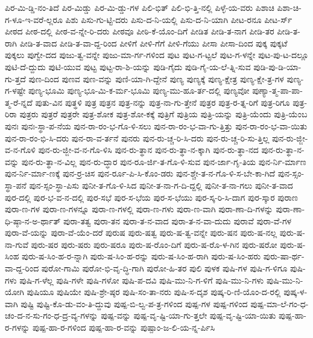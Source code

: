 {ಪಿರ-ಮಿ-ಡ್ಡಿ-ನಂ-ತಿದೆ
ಪಿರ-ಮಿಡ್ಡು
ಪಿರ-ಮಿ-ಡ್ಡು-ಗಳ
ಪಿಲಿ-ಭಿತ್
ಪಿಲಿ-ಭಿ-ತ್ತಿ-ನಲ್ಲಿ
ಪಿಳ್ಳೆ-ಯ-ವರು
ಪಿಶಾಚಿ
ಪಿಶಾ-ಚಿ-ಗ-ಳೂ-ಇ-ವರೆ-ಲ್ಲರೂ
ಪಿಶು
ಪಿಸು-ಗು-ಟ್ಟಿ-ದರು
ಪಿಸು-ದ-ನಿ-ಯಲ್ಲಿ
ಪಿಸು-ದ-ನಿ-ಯಾಗಿ
ಪೀಟ-ರನೂ
ಪೀಟ-ರ್ಸ್
ಪೀಠದ
ಪೀಠ-ದಲ್ಲಿ
ಪೀಠ-ವ-ನ್ನೇ-ರಿ-ದರು
ಪೀಠವೂ
ಪೀಠಿ-ಕೆ-ಯೊಂ-ದಿಗೆ
ಪೀಡಿತ
ಪೀಡಿ-ತ-ನಾಗ
ಪೀಡಿ-ತರ
ಪೀಡಿ-ತ-ರಾಗಿ
ಪೀಡಿ-ತ-ವಾದ
ಪೀಡಿ-ತ-ವಾ-ದ್ದ-ರಿಂದ
ಪೀಳಿಗೆ
ಪೀಳಿ-ಗೆಗೆ
ಪೀಳಿ-ಗೆಯು
ಪೀಸಾ
ಪೀಸಾ-ದಿಂದ
ಪುಕ್ಕ
ಪುಕ್ಕಟೆ
ಪುಕ್ಕಲು
ಪುಗ್ವೇ-ದದ
ಪುಜು-ತ್ವ-ವನ್ನೇ
ಪುಜು-ಮಾ-ರ್ಗ-ಗಳಿಂದ
ಪುಟ
ಪುಟ-ಗ-ಟ್ಟಲೆ
ಪುಟ-ಗ-ಳನ್ನೇ
ಪುಟ-ಪು-ಟ-ದಲ್ಲೂ
ಪುಟಿ-ದೆ-ದ್ದುದು
ಪುಟಿ-ಯುವ
ಪುಟ್ಟ
ಪುಟ್ಟ-ರಾ-ಶಿ-ಯನ್ನು
ಪುಡಿ-ಗೈದು
ಪುಡಿ-ಗೈ-ಯ-ಲೆ-ತ್ನಿ-ಸುವ
ಪುಡಿ-ಪು-ಡಿ-ಯಾ-ಗು-ತ್ತದೆ
ಪುಣ-ದಿಂದ
ಪುಣವ
ಪುಣ-ವನ್ನು
ಪುಣಿ-ಯಾ-ಗಿ-ದ್ದೇನೆ
ಪುಣ್ಯ
ಪುಣ್ಯಕ್ಕೆ
ಪುಣ್ಯ-ಕ್ಷೇತ್ರ
ಪುಣ್ಯ-ಕ್ಷೇ-ತ್ರ-ಗಳ
ಪುಣ್ಯ-ಗ-ಳಷ್ಟೇ
ಪುಣ್ಯ-ಭೂಮಿ
ಪುಣ್ಯ-ಭೂ-ಮಿ-ಕ-ರ್ಮ-ಭೂಮಿ
ಪುಣ್ಯ-ಮು-ಹೂ-ರ್ತ-ದಲ್ಲಿ
ಪುಣ್ಯವೋ
ಪುಣ್ಯಾ-ತ್ಮ-ಪಾ-ಪಾ-ತ್ಮ-ರೆ-ನ್ನದೆ
ಪುತು-ವಿನ
ಪುತ್ಥಳಿ
ಪುತ್ರ
ಪುತ್ರನ
ಪುತ್ರ-ನನ್ನು
ಪುತ್ರ-ನಾ-ಗು-ತ್ತೇನೆ
ಪುತ್ರರ
ಪುತ್ರ-ರ-ತ್ನ-ರಿಗೆ
ಪುತ್ರ-ರಿಗೂ
ಪುತ್ರ-ರಿರಾ
ಪುತ್ರರು
ಪುತ್ರರೆ
ಪುತ್ರರೇ
ಪುತ್ರ-ಶೋಕ
ಪುತ್ರ-ಶೋ-ಕಕ್ಕೆ
ಪುತ್ರಿಗೆ
ಪುತ್ರಿಯ
ಪುತ್ರಿ-ಯನ್ನು
ಪುತ್ರಿ-ಯೆಂದು
ಪುತ್ರಿ-ಯೆಂಬ
ಪುನಃ
ಪುನಃ-ಸ್ಥಾ-ಪ-ನೆಯ
ಪುನ-ರಾ-ರಂ-ಭ-ಗೊ-ಳಿ-ಸಲು
ಪುನ-ರಾ-ರಂ-ಭ-ವಾ-ಗು-ತ್ತಿತ್ತು
ಪುನ-ರಾ-ರಂ-ಭ-ವಾ-ಯಿತು
ಪುನ-ರಾ-ರಂ-ಭಿ-ಸಿ-ದರು
ಪುನ-ರಾ-ವ-ರ್ತನೆ
ಪುನರು
ಪುನ-ರು-ಚ್ಚ-ರಿ-ಸಿ-ದರು
ಪುನ-ರು-ಚ್ಚ-ರಿ-ಸು-ತ್ತಿಲ್ಲ
ಪುನ-ರು-ಜ್ಜೀ-ವ-ನ-ಗೊಳಿ
ಪುನ-ರು-ಜ್ಜೀ-ವ-ನ-ಗೊ-ಳಿಸಿ
ಪುನ-ರು-ತ್ಥಾನ
ಪುನ-ರು-ತ್ಥಾ-ನ-ಕ್ಕಾಗಿ
ಪುನ-ರು-ತ್ಥಾ-ನದ
ಪುನ-ರು-ತ್ಥಾ-ನ-ವನ್ನು
ಪುನ-ರು-ತ್ಥಾ-ನ-ವಿಲ್ಲ
ಪುನ-ರು-ದ್ಧಾರ
ಪುನ-ರೂ-ರ್ಜಿ-ತ-ಗೊ-ಳಿ-ಸುವ
ಪುನ-ರ್ಜಾ-ಗೃ-ತಿಯ
ಪುನ-ರ್ನಿ-ರ್ಮಾಣ
ಪುನ-ರ್ನಿ-ರ್ಮಾ-ಣಕ್ಕೆ
ಪುನ-ರ್ರ-ಚಿಸ
ಪುನ-ರ್ರೂ-ಪಿ-ಸಿ-ಕೊಂ-ಡರು
ಪುನ-ಶ್ಚೇ-ತ-ನ-ಗೊ-ಳಿ-ಸ-ಬೇ-ಕಾ-ಗಿದೆ
ಪುನ-ಸ್ಸಂ-ಸ್ಥಾ-ಪನೆ
ಪುನ-ಸ್ಸಂ-ಸ್ಥಾ-ಪಿಸು
ಪುನೀ-ತ-ಗೊ-ಳಿ-ಸಿದ
ಪುನೀ-ತ-ನಾ-ಗ-ದಿ-ದ್ದಲ್ಲಿ
ಪುನೀ-ತ-ನಾ-ಗಲು
ಪುನೀ-ತ-ವಾದ
ಪುರ-ದಲ್ಲಿ
ಪುರ-ಭ-ವ-ನ-ದಲ್ಲಿ
ಪುರ-ಸಭೆ
ಪುರ-ಸ-ಭೆಯ
ಪುರ-ಸ-ಭೆಯು
ಪುರ-ಸ್ಕ-ರಿ-ಸಿ-ದಾಗ
ಪುರ-ಸ್ಕಾರ
ಪುರಾಣ
ಪುರಾ-ಣ-ಗಳ
ಪುರಾ-ಣ-ಗಳನ್ನೂ
ಪುರಾ-ಣ-ಗಳಲ್ಲಿ
ಪುರಾ-ಣ-ಗಳು
ಪುರಾ-ಣ-ವಾಗಿ
ಪುರಾ-ಣಾ-ದಿ-ಗಳನ್ನು
ಪುರಾ-ಣಾ-ಧಿ-ಷ್ಠಾ-ನ-ಅ-ರ್ಥಾತ್
ಪುರಾ-ತತ್ವ
ಪುರಾ-ತನ
ಪುರಾ-ತ-ನ-ವಾದ
ಪುರಾ-ತ-ನ-ವಾ-ದುದು
ಪುರಾವೆ
ಪುರಾ-ವೆ-ಗಳ
ಪುರಾ-ವೆ-ಯನ್ನು
ಪುರಾ-ವೆ-ಯೆಂ-ದರೆ
ಪುರುಷ
ಪುರು-ಷತ್ವ
ಪುರು-ಷ-ತ್ವ-ವನ್ನೇ
ಪುರು-ಷನ
ಪುರು-ಷ-ನಲ್ಲ
ಪುರು-ಷ-ನಾ-ಗುವೆ
ಪುರು-ಷರ
ಪುರು-ಷರು
ಪುರು-ಷರೂ
ಪುರು-ಷ-ರೊಂ-ದಿಗೆ
ಪುರು-ಷ-ರೊ-ಳ-ಗಿನ
ಪುರು-ಷರೋ
ಪುರು-ಷ-ಸಿಂಹ
ಪುರು-ಷ-ಸಿಂ-ಹ-ರ-ನ್ನಾಗಿ
ಪುರು-ಷ-ಸಿಂ-ಹ-ರನ್ನು
ಪುರು-ಷ-ಸಿಂ-ಹ-ರಾಗಿ
ಪುರು-ಷ-ಸಿಂ-ಹರು
ಪುರು-ಷಾ-ರ್ಥ-ವಾ-ದ್ದ-ರಿಂದ
ಪುರೋ-ಗಾಮಿ
ಪುರೋ-ಭಿ-ವೃ-ದ್ಧಿ-ಗಾಗಿ
ಪುರೋ-ಹಿ-ತರ
ಪುಲಿ
ಪುಳಕ
ಪುಷಿ-ಗಳ
ಪುಷಿ-ಗ-ಳಿಗೂ
ಪುಷಿ-ಗಳು
ಪುಷಿ-ಗ-ಳೆಲ್ಲ
ಪುಷಿ-ಗಳೇ
ಪುಷಿ-ಗಳೋ
ಪುಷಿ-ಪ-ದವಿ
ಪುಷಿ-ಮು-ನಿ-ಗ-ಳಿಗೆ
ಪುಷಿ-ಮು-ನಿ-ಗಳು
ಪುಷಿ-ಮು-ನಿ-ಯೋಗಿ
ಪುಷಿಯೂ
ಪುಷಿಯೇ
ಪುಷಿ-ಶ್ರೇ-ಷ್ಠರ
ಪುಷಿ-ಸಂ-ತಾ-ನರು
ಪುಷಿ-ಸ-ದೃಶ
ಪುಷ್ಕ-ರಿ-ಣಿ-ಯೊಂ-ದ-ರಲ್ಲಿ
ಪುಷ್ಕ-ಳ-ವಾಗಿ
ಪುಷ್ಟಿ
ಪುಷ್ಟಿ-ಕೊ-ಡು-ವಂ-ತಿ-ದ್ದುವು
ಪುಷ್ಪ-ಬಿ-ಲ್ವ-ಪ-ತ್ರ-ಗಳಿಂದ
ಪುಷ್ಪ-ಗಳ
ಪುಷ್ಪ-ಗಳಿಂದ
ಪುಷ್ಪ-ಮಾ-ಲೆ-ಗಂ-ಧ-ಚಂ-ದ-ನ-ಸು-ಗಂ-ಧ-ದ್ರ-ವ್ಯ-ಗಳನ್ನು
ಪುಷ್ಪ-ವನ್ನು
ಪುಷ್ಪ-ವೃ-ಷ್ಟಿ-ಯಾ-ಗು-ತ್ತಲೇ
ಪುಷ್ಪ-ವೃ-ಷ್ಟಿ-ಯಾ-ಯಿತು
ಪುಷ್ಪ-ಹಾ-ರ-ಗಳನ್ನು
ಪುಷ್ಪ-ಹಾ-ರ-ಗಳಿಂದ
ಪುಷ್ಪ-ಹಾ-ರ-ವನ್ನು
ಪುಷ್ಪಾಂ-ಜ-ಲಿ-ಯ-ನ್ನ-ರ್ಪಿಸಿ
}
